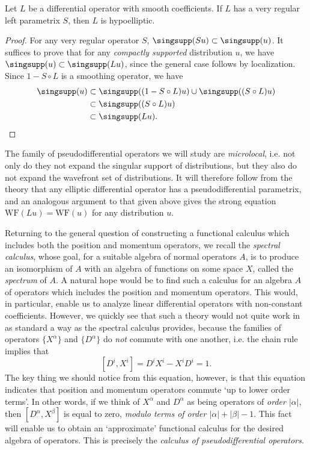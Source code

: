\begin{theorem}
    Let $L$ be a differential operator with smooth coefficients. If $L$ has a very regular left parametrix $S$, then $L$ is hypoelliptic.
\end{theorem}
\begin{proof}
    For any very regular operator $S$, $\singsupp(Su) \subset \singsupp(u)$. It suffices to prove that for any \emph{compactly supported} distribution $u$, we have $\singsupp(u) \subset \singsupp(Lu)$, since the general case follows by localization. Since $1 - S \circ L$ is a smoothing operator, we have
    \begin{align*}
        \singsupp(u) &\subset \singsupp((1 - S \circ L) u) \cup \singsupp((S \circ L) u)\\
        &\subset \singsupp((S \circ L) u)\\
        &\subset \singsupp(Lu). \qedhere
    \end{align*}
\end{proof}

The family of pseudodifferential operators we will study are \emph{microlocal}, i.e. not only do they not expand the singular support of distributions, but they also do not expand the wavefront set of distributions. It will therefore follow from the theory that any elliptic differential operator has a pseudodifferential parametrix, and an analogous argument to that given above gives the strong equation $\text{WF}(Lu) = \text{WF}(u)$ for any distribution $u$.

Returning to the general question of constructing a functional calculus which includes both the position and momentum operators, we recall the \emph{spectral calculus}, whose goal, for a suitable algebra of normal operators $A$, is to produce an isomorphism of $A$ with an algebra of functions on some space $X$, called the \emph{spectrum} of $A$. A natural hope would be to find such a calculus for an algebra $A$ of operators which includes the position and momentum operators. This would, in particular, enable us to analyze linear differential operators with non-constant coefficients. However, we quickly see that such a theory would not quite work in as standard a way as the spectral calculus provides, because the families of operators $\{ X^\alpha \}$ and $\{ D^\alpha \}$ do \emph{not} commute with one another, i.e. the chain rule implies that
%
\[ [D^i,X^i] = D^i X^i - X^i D^i = 1. \]
%
The key thing we should notice from this equation, however, is that this equation indicates that position and momentum operators commute `up to lower order terms'. In other words, if we think of $X^\alpha$ and $D^\alpha$ as being operators of \emph{order $|\alpha|$}, then $[D^\alpha,X^\beta]$ is equal to zero, \emph{modulo terms of order $|\alpha| + |\beta| - 1$}. This fact will enable us to obtain an `approximate' functional calculus for the desired algebra of operators. This is precisely the \emph{calculus of pseudodifferential operators}.

